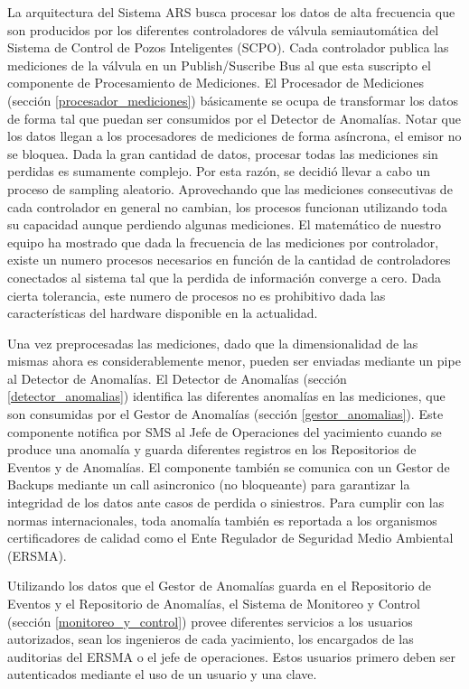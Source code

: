 \documentclass{article}
\theoremstyle{definition}
\theoremstyle{remark}
\begin{document}
La arquitectura del Sistema ARS busca procesar los datos de alta frecuencia que son producidos por los diferentes controladores de válvula semiautomática del Sistema de Control de Pozos Inteligentes (SCPO). Cada controlador publica las mediciones de la válvula en un Publish/Suscribe Bus al que esta suscripto el componente de Procesamiento de Mediciones. El Procesador de Mediciones (sección \ref{procesador_mediciones}) básicamente se ocupa de transformar los datos de forma tal que puedan ser consumidos por el Detector de Anomalías. Notar que los datos llegan a los procesadores de mediciones de forma asíncrona, el emisor no se bloquea. Dada la gran cantidad de datos, procesar todas las mediciones sin perdidas es sumamente complejo. Por esta razón, se decidió llevar a cabo un proceso de sampling aleatorio. Aprovechando que las mediciones consecutivas de cada controlador en general no cambian, los procesos funcionan utilizando toda su capacidad aunque perdiendo algunas mediciones. El matemático de nuestro equipo ha mostrado que dada la frecuencia de las mediciones por controlador, existe un numero procesos necesarios en función de la cantidad de controladores conectados al sistema tal que la perdida de información converge a cero. Dada cierta tolerancia, este numero de procesos no es prohibitivo dada las características del hardware disponible en la actualidad.

Una vez preprocesadas las mediciones, dado que la dimensionalidad de las mismas ahora es considerablemente menor, pueden ser enviadas mediante un pipe al Detector de Anomalías. El Detector de Anomalías (sección \ref{detector_anomalias}) identifica las diferentes anomalías en las mediciones, que son consumidas por el Gestor de Anomalías (sección \ref{gestor_anomalias}). Este componente notifica por SMS al Jefe de Operaciones del yacimiento cuando se produce una anomalía y guarda diferentes registros en los Repositorios de Eventos y de Anomalías. El componente también se comunica con un Gestor de Backups mediante un call asincronico (no bloqueante) para garantizar la integridad de los datos ante casos de perdida o siniestros. Para cumplir con las normas internacionales, toda anomalía también es reportada a los organismos certificadores de calidad como el Ente Regulador de Seguridad Medio Ambiental (ERSMA). 

Utilizando los datos que el Gestor de Anomalías guarda en el Repositorio de Eventos y el Repositorio de Anomalías, el Sistema de Monitoreo y Control (sección \ref{monitoreo_y_control}) provee diferentes servicios a los usuarios autorizados, sean los ingenieros de cada yacimiento, los encargados de las auditorias del ERSMA o el jefe de operaciones. Estos usuarios primero deben ser autenticados mediante el uso de un usuario y una clave.
\end{document}
